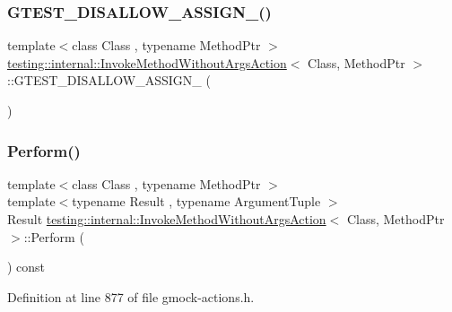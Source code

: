 \subsubsection{\texorpdfstring{G\+T\+E\+S\+T\+\_\+\+D\+I\+S\+A\+L\+L\+O\+W\+\_\+\+A\+S\+S\+I\+G\+N\+\_\+()}{GTEST\_DISALLOW\_ASSIGN\_()}}
{\footnotesize\ttfamily template$<$class Class , typename Method\+Ptr $>$ \\
\hyperlink{classtesting_1_1internal_1_1InvokeMethodWithoutArgsAction}{testing\+::internal\+::\+Invoke\+Method\+Without\+Args\+Action}$<$ Class, Method\+Ptr $>$\+::G\+T\+E\+S\+T\+\_\+\+D\+I\+S\+A\+L\+L\+O\+W\+\_\+\+A\+S\+S\+I\+G\+N\+\_\+ (\begin{DoxyParamCaption}\item[{\hyperlink{classtesting_1_1internal_1_1InvokeMethodWithoutArgsAction}{Invoke\+Method\+Without\+Args\+Action}$<$ Class, Method\+Ptr $>$}]{ }\end{DoxyParamCaption})\hspace{0.3cm}{\ttfamily [private]}}

\mbox{\label{classtesting_1_1internal_1_1InvokeMethodWithoutArgsAction_a9915e4f7a064e00b7798216644670b52}} 
\subsubsection{\texorpdfstring{Perform()}{Perform()}}
{\footnotesize\ttfamily template$<$class Class , typename Method\+Ptr $>$ \\
template$<$typename Result , typename Argument\+Tuple $>$ \\
Result \hyperlink{classtesting_1_1internal_1_1InvokeMethodWithoutArgsAction}{testing\+::internal\+::\+Invoke\+Method\+Without\+Args\+Action}$<$ Class, Method\+Ptr $>$\+::Perform (\begin{DoxyParamCaption}\item[{const Argument\+Tuple \&}]{ }\end{DoxyParamCaption}) const\hspace{0.3cm}{\ttfamily [inline]}}



Definition at line 877 of file gmock-\/actions.\+h.


